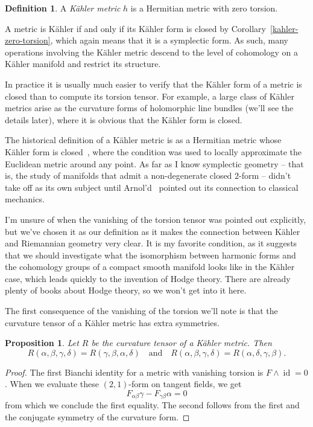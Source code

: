 \documentclass[11pt]{article}
\newtheorem{prop}[theo]{Proposition}
\theoremstyle{definition}
\newtheorem{defi}[theo]{Definition}
\DeclareMathOperator{\id}{id}
\begin{document}
\begin{defi}
A \emph{K\"ahler metric} $h$ is a Hermitian metric with zero torsion.
\end{defi}


A metric is K\"ahler if and only if its K\"ahler form is closed by Corollary~\ref{kahler-zero-torsion}, which again means that it is a symplectic form. As such, many operations involving the K\"ahler metric descend to the level of cohomology on a K\"ahler manifold and restrict its structure.

In practice it is usually much easier to verify that the K\"ahler form of a metric is closed than to compute its torsion tensor. For example, a large class of K\"ahler metrics arise as the curvature forms of holomorphic line bundles (we'll see the details later), where it is obvious that the K\"ahler form is closed.

The historical definition of a K\"ahler metric is as a Hermitian metric whose K\"ahler form is closed~\cite{kahler}, where the condition was used to locally approximate the Euclidean metric around any point. As far as I know symplectic geometry -- that is, the study of manifolds that admit a non-degenerate closed $2$-form -- didn't take off as its own subject until Arnol'd~\cite{arnold} pointed out its connection to classical mechanics.

I'm unsure of when the vanishing of the torsion tensor was pointed out explicitly, but we've chosen it as our definition as it makes the connection between K\"ahler and Riemannian geometry very clear. It is my favorite condition, as it suggests that we should investigate what the isomorphism between harmonic forms and the cohomology groups of a compact smooth manifold looks like in the K\"ahler case, which leads quickly to the invention of Hodge theory. There are already plenty of books about Hodge theory, so we won't get into it here.

The first consequence of the vanishing of the torsion we'll note is that the curvature tensor of a K\"ahler metric has extra symmetries.

\begin{prop}
Let $R$ be the curvature tensor of a K\"ahler metric. Then
$$
R(\alpha,\beta,\gamma,\delta) = R(\gamma,\beta,\alpha,\delta)
\quad\text{and}\quad
R(\alpha,\beta,\gamma,\delta) = R(\alpha,\delta,\gamma,\beta).
$$
\end{prop}

\begin{proof}
The first Bianchi identity for a metric with vanishing torsion is $F \wedge \id = 0$. When we evaluate these $(2,1)$-form on tangent fields, we get
$$
F_{\alpha\beta}\gamma - F_{\gamma\beta}\alpha = 0
$$
from which we conclude the first equality. The second follows from the first and the conjugate symmetry of the curvature form.
\end{proof}
\end{document}
